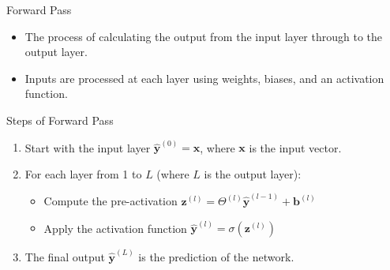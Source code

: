 \documentclass[aspectratio=169]{../latex_main/tntbeamer}  %
\begin{document}
  	\begin{frame}{Forward Pass}

        \begin{itemize}
            \item The process of calculating the output from the input layer through to the output layer.
            \item Inputs are processed at each layer using weights, biases, and an activation function.
        \end{itemize}

        
        \begin{block}{Steps of Forward Pass}
        \begin{enumerate}
            \item Start with the input layer \( \hat{\textbf{y}}^{(0)} = \textbf{x} \), where \( \textbf{x} \) is the input vector.
            \item For each layer from 1 to \( L \) (where \( L \) is the output layer):
                \begin{itemize}
                    \item Compute the pre-activation \( \textbf{z}^{(l)} = \Theta^{(l)} \hat{\textbf{y}}^{(l-1)} + \textbf{b}^{(l)} \)
                    \item Apply the activation function \( \hat{\textbf{y}}^{(l)} = \sigma(\textbf{z}^{(l)}) \)
                \end{itemize}
            \item The final output \( \hat{\textbf{y}}^{(L)} \) is the prediction of the network.
        \end{enumerate}
        \end{block}
                
	  \end{frame}
\end{document}
